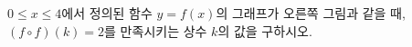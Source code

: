 \hspace*{2mm}\begin{minipage}[t]{\dimexpr\linewidth-2mm\relax}\vspace{0pt}
\noindent\begin{minipage}[t]{0.58\linewidth}\vspace{0pt}\raggedright $0\le x\le 4$에서 정의된 함수 $y=f(x)$의 그래프가 오른쪽 그림과 같을 때, $(f\circ f)(k)=2$를 만족시키는 상수 $k$의 값을 구하시오.\end{minipage}\hfill\begin{minipage}[t]{0.4\linewidth}\vspace{0pt}\centering \resizebox{\ifdim\width>\linewidth\linewidth\else\width\fi}{!}{}\end{minipage}\par\end{minipage}

